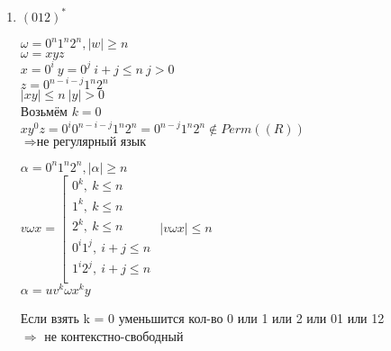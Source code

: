 \documentclass{article}
\begin{document}
\begin{enumerate}
            \item $(012)^*$ \\
            
                \begin{center}
                    $\omega = 0^n 1^n 2^n, |w| \geq n$ \\
                    $\omega = xyz$ \\
                    $x = 0^i \  y = 0^j \  i + j \leq n \  j > 0$ \\
                    $z = 0^{n-i-j} 1^n 2^n$ \\
                    $|xy| \leq n \  |y| > 0$ \\
                    Возьмём $k = 0$ \\
                    $xy^0z = 0^i 0^{n-i-j} 1^n 2^n = 0^{n-j} 1^n 2^n \notin Perm((R))$ \\
                    $\Rightarrow \textbf{не регулярный язык}$
                \end{center}
                
                \begin{center}
                    $\alpha = 0^n 1^n 2^n, |\alpha| \ge n$ \\
                    $v \omega x =\left[ 
                    \begin{gathered} 
                        0^k, \ k \leq n \\ 
                        1^k, \ k \leq n \\
                        2^k, \ k \leq n \\ 
                        0^i 1^j, \ i + j \leq n \\ 
                        1^i 2^j, \ i + j \leq n \\ 
                    \end{gathered} 
                    \right.$
                    $|v \omega x| \leq n$ \\
                    $\alpha = u v^k \omega x^k y$ \\
                \end{center}
                
                Если взять k = 0 уменьшится кол-во 0 или 1 или 2 или 01 или 12 \\
                $\Rightarrow$ не контекстно-свободный 
        \end{enumerate}
    
\end{document}
